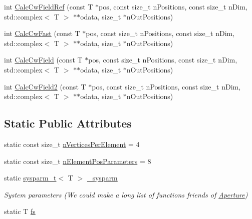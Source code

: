 \begin{DoxyCompactItemize}
\item 
int \hyperlink{classfnm_1_1Aperture_aa12e26aae03e1310de3b419d6eda061c}{Calc\+Cw\+Field\+Ref} (const T $\ast$pos, const size\+\_\+t n\+Positions, const size\+\_\+t n\+Dim, std\+::complex$<$ T $>$ $\ast$$\ast$odata, size\+\_\+t $\ast$n\+Out\+Positions)
\item 
int \hyperlink{classfnm_1_1Aperture_affc58ecd7f649cbeab23b676f308f185}{Calc\+Cw\+Fast} (const T $\ast$pos, const size\+\_\+t n\+Positions, const size\+\_\+t n\+Dim, std\+::complex$<$ T $>$ $\ast$$\ast$odata, size\+\_\+t $\ast$n\+Out\+Positions)
\item 
int \hyperlink{classfnm_1_1Aperture_ac02ec8b45ead743c15fd64127a9cff67}{Calc\+Cw\+Field} (const T $\ast$pos, const size\+\_\+t n\+Positions, const size\+\_\+t n\+Dim, std\+::complex$<$ T $>$ $\ast$$\ast$odata, size\+\_\+t $\ast$n\+Out\+Positions)
\item 
int \hyperlink{classfnm_1_1Aperture_a00d23fa1c2a6c6547606702a72d71aa1}{Calc\+Cw\+Field2} (const T $\ast$pos, const size\+\_\+t n\+Positions, const size\+\_\+t n\+Dim, std\+::complex$<$ T $>$ $\ast$$\ast$odata, size\+\_\+t $\ast$n\+Out\+Positions)
\end{DoxyCompactItemize}

\subsection*{Static Public Attributes}
\begin{DoxyCompactItemize}
\item 
static const size\+\_\+t \hyperlink{classfnm_1_1Aperture_ac08006cf2e1c77856e2332b6d98ca861}{n\+Vertices\+Per\+Element} = 4
\item 
static const size\+\_\+t \hyperlink{classfnm_1_1Aperture_adaffd7c31c339cecbb613daa7eae4f64}{n\+Element\+Pos\+Parameters} = 8
\item 
static \hyperlink{structfnm_1_1sysparm__t}{sysparm\+\_\+t}$<$ T $>$ \hyperlink{classfnm_1_1Aperture_a7f24436369eec62f8d62cd18fc1eda03}{\+\_\+sysparm}
\begin{DoxyCompactList}\small\item\em System parameters (We could make a long list of functions friends of \hyperlink{classfnm_1_1Aperture}{Aperture}) \end{DoxyCompactList}\item 
static T \hyperlink{classfnm_1_1Aperture_aeba68ad214d4eb5ef51b3f3763d099dd}{fs}
\end{DoxyCompactItemize}


